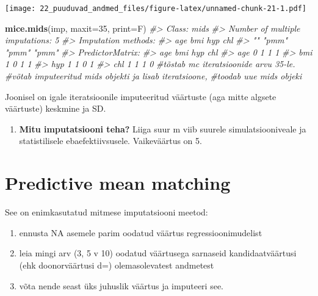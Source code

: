 \documentclass[]{book}
\newenvironment{Shaded}{\begin{snugshade}}{\end{snugshade}}
\newcommand{\CommentTok}[1]{\textcolor[rgb]{0.56,0.35,0.01}{\textit{#1}}}
\newcommand{\DataTypeTok}[1]{\textcolor[rgb]{0.13,0.29,0.53}{#1}}
\newcommand{\DecValTok}[1]{\textcolor[rgb]{0.00,0.00,0.81}{#1}}
\newcommand{\KeywordTok}[1]{\textcolor[rgb]{0.13,0.29,0.53}{\textbf{#1}}}
\newcommand{\NormalTok}[1]{#1}
\providecommand{\tightlist}{%
  \setlength{\itemsep}{0pt}\setlength{\parskip}{0pt}}
\begin{document}
\texttt{[image: 22\_puuduvad\_andmed\_files/figure-latex/unnamed-chunk-21-1.pdf]}

\begin{Shaded}
\begin{Highlighting}[]
\KeywordTok{mice.mids}\NormalTok{(imp, }\DataTypeTok{maxit=}\DecValTok{35}\NormalTok{, }\DataTypeTok{print=}\NormalTok{F) }
\CommentTok{#> Class: mids}
\CommentTok{#> Number of multiple imputations:  5 }
\CommentTok{#> Imputation methods:}
\CommentTok{#>   age   bmi   hyp   chl }
\CommentTok{#>    "" "pmm" "pmm" "pmm" }
\CommentTok{#> PredictorMatrix:}
\CommentTok{#>     age bmi hyp chl}
\CommentTok{#> age   0   1   1   1}
\CommentTok{#> bmi   1   0   1   1}
\CommentTok{#> hyp   1   1   0   1}
\CommentTok{#> chl   1   1   1   0}
\CommentTok{#tõstab mc iteratsioonide arvu 35-le.}
\CommentTok{#võtab imputeeritud mids objekti ja lisab iteratsioone, }
\CommentTok{#toodab uue mids objeki}
\end{Highlighting}
\end{Shaded}

Joonisel on igale iteratsioonile imputeeritud väärtuste (aga mitte algsete väärtuste) keskmine ja SD.

\begin{enumerate}
\def\labelenumi{\arabic{enumi}.}
\setcounter{enumi}{6}
\tightlist
\item
  \textbf{Mitu imputatsiooni teha?} Liiga suur m viib suurele simulatsiooniveale ja statistilisele ebaefektiivsusele. Vaikeväärtus on 5.
\end{enumerate}

\hypertarget{predictive-mean-matching}{%
\section{Predictive mean matching}\label{predictive-mean-matching}}

See on enimkasutatud mitmese imputatsiooni meetod:

\begin{enumerate}
\def\labelenumi{\arabic{enumi}.}
\item
  ennusta NA asemele parim oodatud väärtus regressioonimudelist
\item
  leia mingi arv (3, 5 v 10) oodatud väärtusega sarnaseid kandidaatväärtusi (ehk doonorväärtusi d=) olemasolevatest andmetest
\item
  võta nende seast üks juhuslik väärtus ja imputeeri see.
\end{enumerate}
\end{document}
